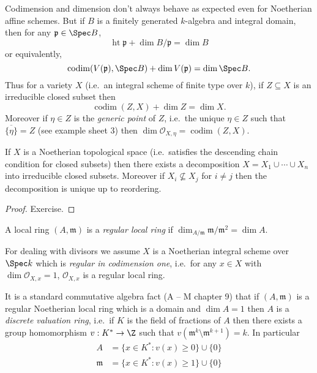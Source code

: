 \documentclass[a4paper]{article}
\newcommand{\sh}[1]{\mathcal{#1}} %
\DeclareMathOperator{\codim}{codim} %
\begin{document}
\begin{remark}
  Codimension and dimension don't always behave as expected even for Noetherian affine schemes. But if \(B\) is a finitely generated \(k\)-algebra and integral domain, then for any \(\mathfrak p \in \Spec B\),
  \[
    \operatorname{ht} \mathfrak p + \dim B/\mathfrak p = \dim B
  \]
  or equivalently,
  \[
    \codim(V(\mathfrak p), \Spec B) + \dim V(\mathfrak p) = \dim \Spec B.
  \]
  Thus for a variety \(X\) (i.e.\ an integral scheme of finite type over \(k\)), if \(Z \subseteq X\) is an irreducible closed subset then
  \[
    \codim (Z, X) + \dim Z = \dim X.
  \]
  Moreover if \(\eta \in Z\) is the \emph{generic point} of \(Z\), i.e.\ the unique \(\eta \in Z\) such that \(\overline{\{\eta\}} = Z\) (see example sheet 3) then \(\dim \sh O_{X, \eta} = \codim(Z, X)\).
\end{remark}

\begin{proposition}
  If \(X\) is a Noetherian topological space (i.e.\ satisfies the descending chain condition for closed subsets) then there exists a decomposition \(X = X_1 \cup \cdots \cup X_n\) into irreducible closed subsets. Moreover if \(X_i \nsubseteq X_j\) for \(i \neq j\) then the decomposition is unique up to reordering.
\end{proposition}

\begin{proof}
  Exercise.
\end{proof}

\begin{definition}
  A local ring \((A, \mathfrak m)\) is a \emph{regular local ring} if \(\dim_{A/\mathfrak m} \mathfrak m/\mathfrak m^2 = \dim A\).
\end{definition}

For dealing with divisors we assume \(X\) is a Noetherian integral scheme over \(\Spec k\) which is \emph{regular in codimension one}, i.e.\ for any \(x \in X\) with \(\dim \sh O_{X, x} = 1\), \(\sh O_{X, x}\) is a regular local ring.

\begin{remark}
  It is a standard commutative algebra fact (A -- M chapter 9) that if \((A, \mathfrak m)\) is a regular Noetherian local ring which is a domain and \(\dim A = 1\) then \(A\) is a \emph{discrete valuation ring}, i.e.\ if \(K\) is the field of fractions of \(A\) then there exists a group homomorphism \(v: K^* \to \Z\) such that \(v(\mathfrak m^k \setminus \mathfrak m^{k + 1}) = k\). In particular
  \begin{align*}
    A &= \{x \in K^*: v(x) \geq 0\} \cup \{0\} \\
    \mathfrak m &= \{x \in K^*: v(x) \geq 1\} \cup \{0\}
  \end{align*}
\end{remark}
\end{document}
